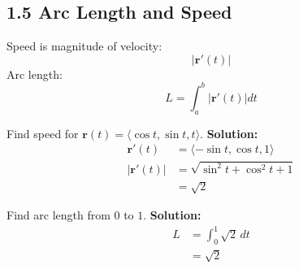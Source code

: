 \subsection*{1.5 Arc Length and Speed}

\begin{conceptbox}
    Speed is magnitude of velocity:
    \begin{equation*}
        |\mathbf{r}'(t)|
    \end{equation*}
    Arc length:
    \begin{equation*}
        L = \int_a^b |\mathbf{r}'(t)| dt
    \end{equation*}
\end{conceptbox}

\begin{examplebox}
    Find speed for $\mathbf{r}(t)=\langle \cos t, \sin t, t\rangle$.
    \newline \textbf{Solution:}
    \begin{align*}
        \mathbf{r}'(t)   & = \langle -\sin t, \cos t, 1 \rangle \\
        |\mathbf{r}'(t)| & = \sqrt{\sin^2 t + \cos^2 t + 1}     \\
                         & = \sqrt{2}
    \end{align*}
\end{examplebox}

\begin{examplebox}
    Find arc length from $0$ to $1$.
    \newline \textbf{Solution:}
    \begin{align*}
        L & = \int_0^1 \sqrt{2}\, dt \\
          & = \sqrt{2}
    \end{align*}
\end{examplebox}
